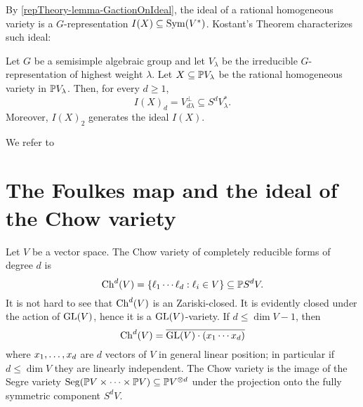 By \ref{repTheory-lemma-GactionOnIdeal}, the ideal of a rational homogeneous variety is a $G$-representation $I(X) \subseteq \operatorname{Sym}( V^*)$. Kostant's Theorem characterizes such ideal:
\begin{theorem}
 \label{reptheory-theorem-kostant}
Let $G$ be a semisimple algebraic group and let $V_\lambda$ be the irreducible $G$-representation of highest weight $\lambda$. Let $X \subseteq \mathbb{P} V_\lambda$ be the rational homogeneous variety in $\mathbb{P} V_\lambda$. Then, for every $d \geq 1$, 
\[
I(X)_d = V_{d\lambda}^\perp \subseteq S^d V_\lambda^*.
\]
Moreover, $I(X)_2$ generates the ideal $I(X)$.
\end{theorem}
We refer to \cite[Ch.16]{Lan12}

\section{The Foulkes map and the ideal of the Chow variety}
\label{RepTheory-section-foulkes}

Let $V$ be a vector space. The Chow variety of completely reducible forms of degree $d$ is 
\[
\mathrm{Ch}^{d}(V) = \{ \ell_1 \cdots \ell_d : \ell_i \in V \} \subseteq \mathbb{P} S^d V.
\]
It is not hard to see that $\mathrm{Ch}^d(V)$ is an Zariski-closed. It is evidently closed under the action of $\mathrm{GL}(V)$, hence it is a $\mathrm{GL}(V)$-variety. If $d \leq \dim V -1$, then 
\[
\mathrm{Ch}^d(V) = \overline{\mathrm{GL}(V) \cdot (x_1 \cdots x_d)}
\]
where $x_1 , \ldots , x_d$ are $d$ vectors of $V$ in general linear position; in particular if $d\leq \dim V$ they are linearly independent. The Chow variety is the image of the Segre variety $\mathrm{Seg}(\mathbb{P} V \times \cdots \times \mathbb{P} V) \subseteq \mathbb{P} V^{\otimes d}$ under the projection onto the fully symmetric component $S^d V$.

